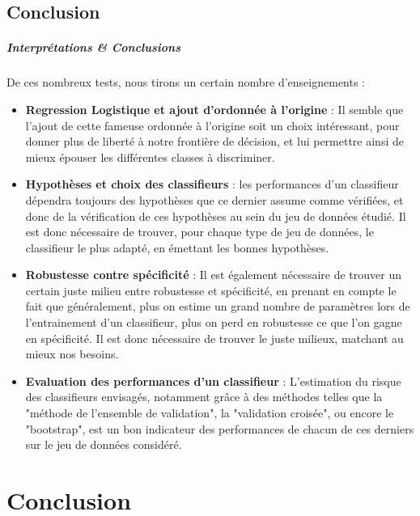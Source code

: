 \documentclass{report}
\begin{document}
\newpage
\section{Conclusion}
\paragraph{Interprétations \& Conclusions}
De ces nombreux tests, nous tirons un certain nombre d'enseignements :
\begin{itemize}
    \item \textbf{Regression Logistique et ajout d'ordonnée à l'origine} : Il semble que l'ajout de cette fameuse ordonnée à l'origine soit un choix intéressant, pour donner plus de liberté à notre frontière de décision, et lui permettre ainsi de mieux épouser les différentes classes à discriminer.
    \item \textbf{Hypothèses et choix des classifieurs} : les performances d'un classifieur dépendra toujours des hypothèses que ce dernier assume comme vérifiées, et donc de la vérification de ces hypothèses au sein du jeu de données étudié. Il est donc nécessaire de trouver, pour chaque type de jeu de données, le classifieur le plus adapté, en émettant les bonnes hypothèses.
    \item \textbf{Robustesse contre spécificité} : Il est également nécessaire de trouver un certain juste milieu entre robustesse et spécificité, en prenant en compte le fait que généralement, plus on estime un grand nombre de paramètres lors de l'entrainement d'un classifieur, plus on perd en robustesse ce que l'on gagne en spécificité. Il est donc nécessaire de trouver le juste milieux, matchant au mieux nos besoins.
    \item \textbf{Evaluation des performances d'un classifieur} : L'estimation du risque des classifieurs envisagés, notamment grâce à des méthodes telles que la "méthode de l'ensemble de validation", la "validation croisée", ou encore le "bootstrap", est un bon indicateur des performances de chacun de ces derniers sur le jeu de données considéré.
\end{itemize}

\chapter{Conclusion}
\end{document}
